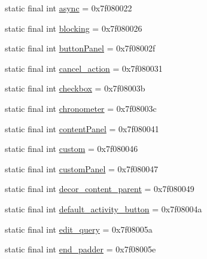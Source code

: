 \begin{DoxyCompactItemize}
\item 
static final int \mbox{\hyperlink{classandroid_1_1support_1_1v7_1_1appcompat_1_1R_1_1id_ae636aadcfedb99007a9fdfbe5ddb4870}{async}} = 0x7f080022
\item 
static final int \mbox{\hyperlink{classandroid_1_1support_1_1v7_1_1appcompat_1_1R_1_1id_aa1bc1c04592e5c26afa5583106c64884}{blocking}} = 0x7f080026
\item 
static final int \mbox{\hyperlink{classandroid_1_1support_1_1v7_1_1appcompat_1_1R_1_1id_a54c250694e2e32d9d0bffc4eb06c2a7c}{button\+Panel}} = 0x7f08002f
\item 
static final int \mbox{\hyperlink{classandroid_1_1support_1_1v7_1_1appcompat_1_1R_1_1id_a8eed8129813c0adb484ad6906f6f2273}{cancel\+\_\+action}} = 0x7f080031
\item 
static final int \mbox{\hyperlink{classandroid_1_1support_1_1v7_1_1appcompat_1_1R_1_1id_ace6d05a8aeb5fac518dcec95ece0b4c2}{checkbox}} = 0x7f08003b
\item 
static final int \mbox{\hyperlink{classandroid_1_1support_1_1v7_1_1appcompat_1_1R_1_1id_afb6264939cc20738a3bda59526ecfdc6}{chronometer}} = 0x7f08003c
\item 
static final int \mbox{\hyperlink{classandroid_1_1support_1_1v7_1_1appcompat_1_1R_1_1id_a7ca9a7024cb6cfea705fe251a7e4a3ab}{content\+Panel}} = 0x7f080041
\item 
static final int \mbox{\hyperlink{classandroid_1_1support_1_1v7_1_1appcompat_1_1R_1_1id_a42c3f8858afe9accbfb229c5a0470024}{custom}} = 0x7f080046
\item 
static final int \mbox{\hyperlink{classandroid_1_1support_1_1v7_1_1appcompat_1_1R_1_1id_a4f4e1a3faa478db1183ae51c17dcff31}{custom\+Panel}} = 0x7f080047
\item 
static final int \mbox{\hyperlink{classandroid_1_1support_1_1v7_1_1appcompat_1_1R_1_1id_aea0320decb2f530b61643c8b8398f559}{decor\+\_\+content\+\_\+parent}} = 0x7f080049
\item 
static final int \mbox{\hyperlink{classandroid_1_1support_1_1v7_1_1appcompat_1_1R_1_1id_a744e60e505fa071f1cc339c813393086}{default\+\_\+activity\+\_\+button}} = 0x7f08004a
\item 
static final int \mbox{\hyperlink{classandroid_1_1support_1_1v7_1_1appcompat_1_1R_1_1id_af94f57ae49bc17ea306089567ef89794}{edit\+\_\+query}} = 0x7f08005a
\item 
static final int \mbox{\hyperlink{classandroid_1_1support_1_1v7_1_1appcompat_1_1R_1_1id_ade99771836755a53a58fb2525d0b5792}{end\+\_\+padder}} = 0x7f08005e

\end{DoxyCompactItemize}
